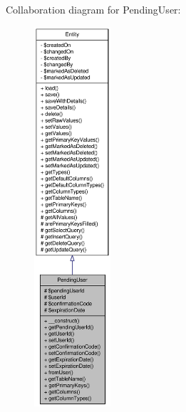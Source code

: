 Collaboration diagram for PendingUser:\nopagebreak
\begin{figure}[H]
\begin{center}
\leavevmode
\includegraphics[height=400pt]{classPendingUser__coll__graph}
\end{center}
\end{figure}
